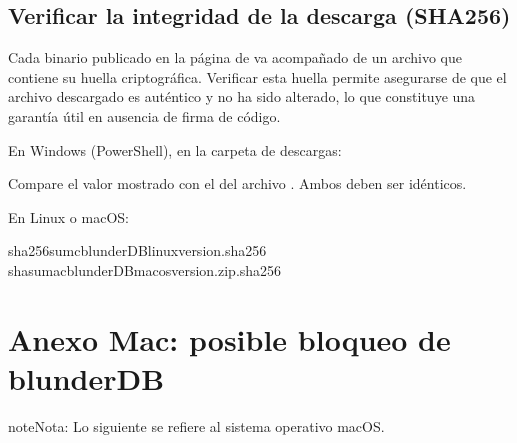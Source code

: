 \documentclass[letterpaper,10pt,spanish]{sphinxmanual}
\begin{document}
\subsection{Verificar la integridad de la descarga (SHA256)}
\label{\detokenize{annexe_windows_securite:verifier-l-integrite-du-telechargement-sha256}}
\sphinxAtStartPar
Cada binario publicado en la página de  va acompañado de un archivo  que contiene su huella criptográfica. Verificar esta huella permite asegurarse de que el archivo descargado es auténtico y no ha sido alterado, lo que constituye una garantía útil en ausencia de firma de código.

\sphinxAtStartPar
En Windows (PowerShell), en la carpeta de descargas:

\begin{sphinxVerbatim}[commandchars=\\\{\}]
   
\end{sphinxVerbatim}

\sphinxAtStartPar
Compare el valor mostrado con el del archivo . Ambos deben ser idénticos.

\sphinxAtStartPar
En Linux o macOS:

\begin{sphinxVerbatim}[commandchars=\\\{\}]
sha256sum\PYGZhy{}cblunderDB\PYGZhy{}linux\PYGZhy{}\PYGZlt{}version\PYGZgt{}.sha256
shasum\PYGZhy{}a\PYGZhy{}cblunderDB\PYGZhy{}macos\PYGZhy{}\PYGZlt{}version\PYGZgt{}.zip.sha256
\end{sphinxVerbatim}

\sphinxstepscope


\section{Anexo Mac: posible bloqueo de blunderDB}
\label{\detokenize{annexe_mac_securite:annexe-mac-blocage-eventuel-de-blunderdb}}\label{\detokenize{annexe_mac_securite:annexe-mac-malware}}\label{\detokenize{annexe_mac_securite::doc}}
\begin{sphinxadmonition}{note}{Nota:}
\sphinxAtStartPar
Lo siguiente se refiere al sistema operativo macOS.
\end{sphinxadmonition}
\end{document}
